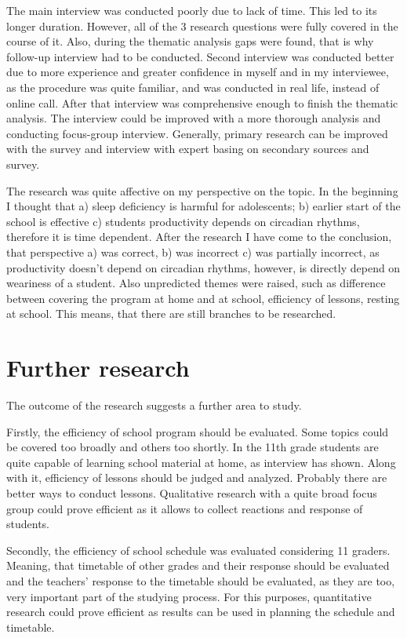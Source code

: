 \documentclass[12pt,a4paper,stu, donotrepeattitle, floatsintext]{apa7}
\begin{document}
The main interview was conducted poorly due to lack of time. This led to its longer duration. However, all of the 3 research questions were fully covered in the course of it. Also, during the thematic analysis gaps were found, that is why follow-up interview had to be conducted. Second interview was conducted better due to more experience and greater confidence in myself and in my interviewee, as the procedure was quite familiar, and was conducted in real life, instead of online call. After that interview was comprehensive enough to finish the thematic analysis. The interview could be improved with a more thorough analysis and conducting focus-group interview. Generally, primary research can be improved with the survey and interview with expert basing on secondary sources and survey.

The research was quite affective on my perspective on the topic. In the beginning I thought that a) sleep deficiency is harmful for adolescents; b) earlier start of the school is effective c) students productivity depends on circadian rhythms, therefore it is time dependent. After the research I have come to the conclusion, that perspective a) was correct, b) was incorrect c) was partially incorrect, as productivity doesn’t depend on circadian rhythms, however, is directly depend on weariness of a student. Also unpredicted themes were raised, such as difference between covering the program at home and at school, efficiency of lessons, resting at school. This means, that there are still branches to be researched.

\newpage
\section{Further research}

The outcome of the research suggests a further area to study.
	
Firstly, the efficiency of school program should be evaluated. Some topics could be covered too broadly and others too shortly. In the 11th grade students are quite capable of learning school material at home, as interview has shown. Along with it, efficiency of lessons should be judged and analyzed. Probably there are better ways to conduct lessons. Qualitative research with a quite broad focus group could prove efficient as it allows to collect reactions and response of students.
	
Secondly, the efficiency of school schedule was evaluated considering 11 graders. Meaning, that timetable of other grades and their response should be evaluated and the teachers’ response to the timetable should be evaluated, as they are too, very important part of the studying process. For this purposes, quantitative research could prove efficient as results can be used in planning the schedule and timetable.

\newpage






\end{document}
